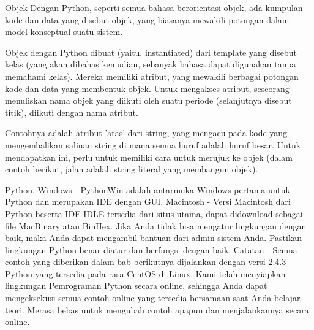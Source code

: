 \vspace{14pt}
\noindent 
{\fontsize{14pt}{14pt}\selectfont Objek Dengan Python, seperti semua bahasa berorientasi objek, ada kumpulan kode dan data yang disebut objek, yang biasanya mewakili potongan dalam model konseptual suatu sistem. \\} \par
\vspace{14pt}
\noindent 
{\fontsize{14pt}{14pt}\selectfont Objek dengan Python dibuat (yaitu, instantiated) dari template yang disebut kelas (yang akan dibahas kemudian, sebanyak bahasa dapat digunakan tanpa memahami kelas). Mereka memiliki atribut, yang mewakili berbagai potongan kode dan data yang membentuk objek. Untuk mengakses atribut, seseorang menuliskan nama objek yang diikuti oleh suatu periode (selanjutnya disebut titik), diikuti dengan nama atribut. \\} \par
\vspace{14pt}
\noindent 
{\fontsize{14pt}{14pt}\selectfont Contohnya adalah atribut 'atas' dari string, yang mengacu pada kode yang mengembalikan salinan string di mana semua huruf adalah huruf besar. Untuk mendapatkan ini, perlu untuk memiliki cara untuk merujuk ke objek (dalam contoh berikut, jalan adalah string literal yang membangun objek). \\} \par
\vspace{14pt}
\noindent 
{\fontsize{14pt}{14pt}\selectfont Python. Windows - PythonWin adalah antarmuka Windows pertama untuk Python dan merupakan IDE dengan GUI. Macintosh - Versi Macintosh dari Python beserta IDE IDLE tersedia dari situs utama, dapat didownload sebagai file MacBinary atau BinHex. Jika Anda tidak bisa mengatur lingkungan dengan baik, maka Anda dapat mengambil bantuan dari admin sistem Anda. Pastikan lingkungan Python benar diatur dan berfungsi dengan baik. Catatan - Semua contoh yang diberikan dalam bab berikutnya dijalankan dengan versi 2.4.3 Python yang tersedia pada rasa CentOS di Linux. Kami telah menyiapkan lingkungan Pemrograman Python secara online, sehingga Anda dapat mengeksekusi semua contoh online yang tersedia bersamaan saat Anda belajar teori. Merasa bebas untuk mengubah contoh apapun dan menjalankannya secara online. \\} \par
\vspace{14pt}
\noindent 
